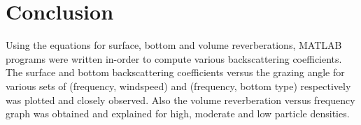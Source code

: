 \chapter*{Conclusion}

\noindent Using the equations for surface, bottom and volume reverberations, MATLAB programs were written in-order to compute various backscattering coefficients. The surface and bottom backscattering coefficients versus the grazing angle for various sets of (frequency, windspeed) and (frequency, bottom type) respectively was plotted and closely observed. Also the volume reverberation versus frequency graph was obtained and explained for high, moderate and low particle densities.
